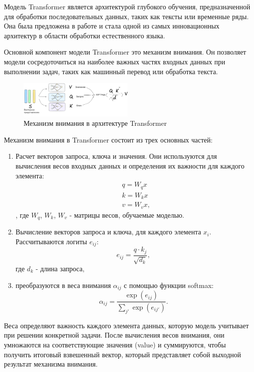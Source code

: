 Модель Transformer является архитектурой глубокого обучения, предназначенной для обработки последовательных данных,
таких как тексты или временные ряды. 
Она была предложена в работе \cite{vaswani2017attention} и стала одной из самых инновационных архитектур
в области обработки естественного языка.

Основной компонент модели Transformer это механизм внимания. Он позволяет модели сосредоточиться 
на наиболее важных частях входных данных при выполнении задач, таких как машинный перевод или обработка текста.

\begin{figure}[h]
    \centering
    \includegraphics[width=0.5\textwidth]{assets/ml/nn/transformer.excalidraw.png}
    \caption{Механизм внимания в архитектуре Transformer \cite{vaswani2017attention} }
    \label{attention}
\end{figure}

Механизм внимания в Transformer состоит из трех основных частей:\begin{enumerate}
    \item  Расчет векторов запроса, ключа и значения.
    Они используются для вычисления весов входных данных и определения их важности для каждого элемента:
    \begin{equation}
        \begin{aligned}
            &q =W_q x \\ 
            &k = W_k x \\
            &v = W_v x,
        \end{aligned}
    \end{equation}
    , где \(W_q\), \(W_k\), \(W_v\) - матрицы весов, обучаемые моделью.
    \item Вычисление векторов запроса и ключа, для каждого элемента \(x_i\). Рассчитываются логиты \(e_{ij}\):
    \begin{equation}
        e_{ij} = \frac{q \cdot k_j}{\sqrt{d_k}} ,
    \end{equation}
    где \(d_k\) - длина запроса,
    \item преобразуются в веса внимания \( \alpha_{ij} \) с помощью функции softmax:
    \begin{equation}
        \alpha_{ij} = \frac{\exp(e_{ij})}{\sum_{j'} \exp(e_{ij'})}.
    \end{equation}
\end{enumerate}

Веса определяют важность каждого элемента данных, которую модель учитывает при решении конкретной задачи. 
После вычисления весов внимания, они умножаются на соответствующие значения (value) и суммируются, 
чтобы получить итоговый взвешенный вектор, который представляет собой выходной результат механизма внимания.